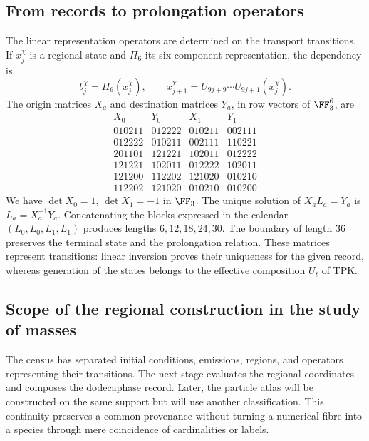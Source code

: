\subsection{From records to prolongation operators}

The linear representation operators are determined on the
transport transitions. If \(x_j^\chi\) is a regional state
and \(\Pi_6\) its six-component representation, the dependency is
\[
 b_j^\chi=\Pi_6(x_j^\chi),\qquad
 x_{j+1}^\chi=U_{9j+9}\cdots U_{9j+1}(x_j^\chi).
\]
The origin matrices \(X_a\) and destination matrices \(Y_a\), in
row vectors of \(\FF_3^6\), are
\[
\begin{array}{c|c|c|c}
X_0&Y_0&X_1&Y_1\\\hline
010211&012222&010211&002111\\
012222&010211&002111&110221\\
201101&121221&102011&012222\\
121221&102011&012222&102011\\
121200&112202&121020&010210\\
112202&121020&010210&010200
\end{array}
\]
We have \(\det X_0=1\), \(\det X_1=-1\) in \(\FF_3\).
The unique solution of \(X_aL_a=Y_a\) is \(L_a=X_a^{-1}Y_a\).
Concatenating the blocks expressed in the calendar
\((L_0,L_0,L_1,L_1)\) produces lengths
\(6,12,18,24,30\). The boundary of length \(36\) preserves
the terminal state and the prolongation relation. These matrices
represent transitions: linear inversion proves their uniqueness
for the given record, whereas generation of the states
belongs to the effective composition \(U_t\) of TPK.

\subsection{Scope of the regional construction in the study of masses}

The census has separated initial conditions, emissions, regions, and
operators representing their transitions. The next stage
evaluates the regional coordinates and composes the dodecaphase record.
Later, the particle atlas will be constructed on the same
support but will use another classification. This continuity preserves
a common provenance without turning a numerical fibre into a
species through mere coincidence of cardinalities or labels.

